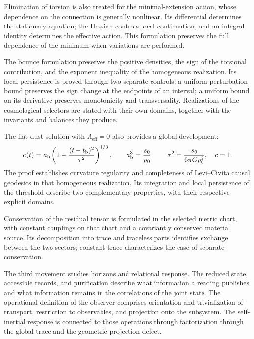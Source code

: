 Elimination of torsion is also treated for the minimal-extension
action, whose dependence on the connection is generally
nonlinear. Its differential determines the stationary equation;
the Hessian controls local continuation, and an integral identity
determines the effective action. This formulation preserves the
full dependence of the minimum when variations are performed.

The bounce formulation preserves the positive densities, the sign of
the torsional contribution, and the exponent inequality of the homogeneous
realization. Its local persistence is proved through two separate
controls: a uniform perturbation bound preserves the sign change
at the endpoints of an interval; a uniform bound on its derivative
preserves monotonicity and transversality. Realizations of the cosmological
selectors are stated with their own domains, together with the
invariants and balances they produce.

The flat dust solution with \(\Lambda_{\mathrm{eff}}=0\)
also provides a global development:
\[
 a(t)=a_{\rm b}\left(1+
       \frac{(t-t_{\rm b})^2}{\tau^2}\right)^{1/3},
 \qquad
 a_{\rm b}^3=\frac{s_0}{\rho_0},\qquad
 \tau^2=\frac{s_0}{6\pi G\rho_0^2},
 \quad c=1.
\]
The proof establishes curvature regularity and completeness of
Levi--Civita causal geodesics in that homogeneous realization.
Its integration and local persistence of the threshold describe two
complementary properties, with their respective explicit domains.

Conservation of the residual tensor is formulated in the selected
metric chart, with constant couplings on that chart and a
covariantly conserved material source. Its decomposition into trace
and traceless parts identifies exchange between the two sectors;
constant trace characterizes the case of separate conservation.

The third movement studies horizons and relational response. The reduced
state, accessible records, and purification describe
what information a reading publishes and what information remains in
the correlations of the joint state. The operational definition of the
observer comprises orientation and trivialization of transport,
restriction to observables, and projection onto the subsystem. The
self-inertial response is connected to those operations through factorization
through the global trace and the geometric projection defect.

